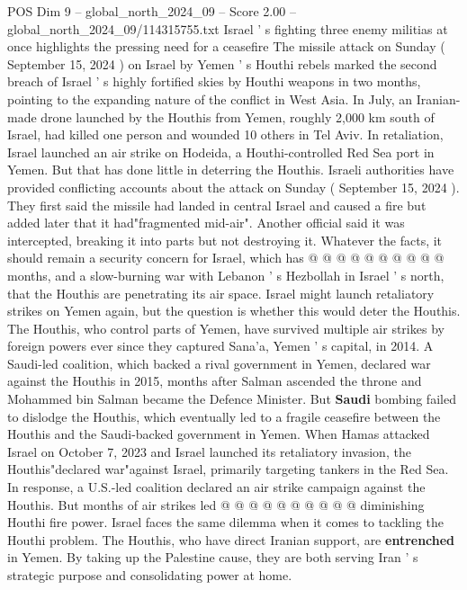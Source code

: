 \begin{textsample}{POS Dim 9 – global\_north\_2024\_09 – Score 2.00 – global\_north\_2024\_09/114315755.txt}  \label{ex:f9_pos_425}
Israel ' s fighting three enemy militias at once highlights the pressing need for a ceasefire The missile attack on Sunday ( September 15, 2024 ) on Israel by Yemen ' s Houthi rebels marked the second breach of Israel ' s highly fortified skies by Houthi weapons in two months, pointing to the expanding nature of the conflict in West Asia.
In July, an Iranian-made drone launched by the Houthis from Yemen, roughly 2,000 km south of Israel, had killed one person and wounded 10 others in Tel Aviv.
In retaliation, Israel launched an air strike on Hodeida, a Houthi-controlled Red Sea port in Yemen.
But that has done little in deterring the Houthis.
Israeli authorities have provided conflicting accounts about the attack on Sunday ( September 15, 2024 ).
They first said the missile had landed in central Israel and caused a fire but added later that it had"fragmented mid-air".
Another official said it was intercepted, breaking it into parts but not destroying it.
Whatever the facts, it should remain a security concern for Israel, which has @ @ @ @ @ @ @ @ @ @ months, and a slow-burning war with Lebanon ' s Hezbollah in Israel ' s north, that the Houthis are penetrating its air space.
Israel might launch retaliatory strikes on Yemen again, but the question is whether this would deter the Houthis.
The Houthis, who control parts of Yemen, have survived multiple air strikes by foreign powers ever since they captured Sana'a, Yemen ' s capital, in 2014.
A Saudi-led coalition, which backed a rival government in Yemen, declared war against the Houthis in 2015, months after Salman ascended the throne and Mohammed bin Salman became the Defence Minister.
But \textbf{Saudi} bombing failed to dislodge the Houthis, which eventually led to a fragile ceasefire between the Houthis and the Saudi-backed government in Yemen.
When Hamas attacked Israel on October 7, 2023 and Israel launched its retaliatory invasion, the Houthis"declared war"against Israel, primarily targeting tankers in the Red Sea.
In response, a U.S.-led coalition declared an air strike campaign against the Houthis.
But months of air strikes led @ @ @ @ @ @ @ @ @ @ diminishing Houthi fire power.
Israel faces the same dilemma when it comes to tackling the Houthi problem.
The Houthis, who have direct Iranian support, are \textbf{entrenched} in Yemen.
By taking up the Palestine cause, they are both serving Iran ' s strategic purpose and consolidating power at home.

\end{textsample}
